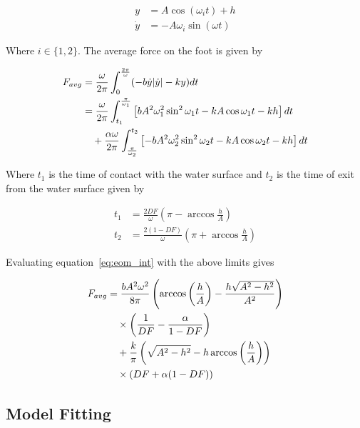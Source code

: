 \begin{align}
	y &= A \cos(\omega_i t) + h \\
	\dot{y} &= -A \omega_i \sin (\omega t)
\end{align}

\noindent Where $i \in \{1,2\}$. The average force on the foot is given by 

\begin{align}
	F_{avg} &= \frac{\omega}{2 \pi} \int_0^{\frac{2 \pi}{\omega}} (-b \dot{y} | \dot{y} | - k y) dt \notag \\
			&= \frac{\omega}{2 \pi} \int_{t_1}^{\frac{\pi}{\omega_1}} \left[ b A^2 \omega_1^2 \sin^2 \omega_1 t - k A \cos \omega_1 t - kh  \right] dt \notag \\
			&\quad + \frac{\alpha \omega}{2 \pi}  \int_{\frac{\pi}{\omega_2}}^{t_2} \left[ -b A^2 \omega_2^2 \sin^2 \omega_2 t - k A \cos \omega_2 t - kh \right] dt \label{eq:eom_int}
\end{align}

\noindent Where $t_1$ is the time of contact with the water surface and $t_2$ is the time of exit from the water surface given by 

\begin{align}
	t_1 &= \frac{2 DF}{\omega} \left( \pi - \arccos \frac{h}{A} \right) \\
	t_2 &= \frac{2 (1 - DF)}{\omega} \left( \pi + \arccos \frac{h}{A}\right)
\end{align}

\noindent Evaluating equation~\ref{eq:eom_int} with the above limits gives

\begin{align}
	F_{avg} &= \frac{b A^2 \omega^2}{8 \pi} \left( \arccos \left(\frac{h}{A}\right) - \frac{h \sqrt{A^2 - h^2}}{A^2} \right) \notag \\
		    &\quad \times \left( \frac{1}{DF} - \frac{\alpha}{1 - DF} \right) \notag \\
			&\quad + \frac{k}{\pi}  \left( \sqrt{A^2 - h^2} - h \arccos \left(\frac{h}{A}\right) \right) \notag \\
			&\quad \times (DF + \alpha (1-DF)) \label{eq:eom_avg}
\end{align}

\subsection{Model Fitting}

